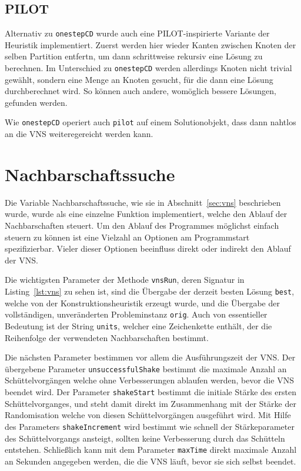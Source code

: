 \subsection{PILOT}
Alternativ zu \texttt{onestepCD} wurde auch eine PILOT-inspirierte Variante der Heuristik implementiert. Zuerst werden hier wieder Kanten zwischen Knoten der selben Partition entfertn, um dann schrittweise rekursiv eine Lösung zu berechnen. Im Unterschied zu \texttt{onestepCD} werden allerdings Knoten nicht trivial gewählt, sondern eine Menge an Knoten gesucht, für die dann eine Lösung durchberechnet wird. So können auch andere, womöglich bessere Lösungen, gefunden werden.

Wie \texttt{onestepCD} operiert auch \texttt{pilot} auf einem Solutionobjekt, dass dann nahtlos an die VNS weiteregereicht werden kann.

\section{Nachbarschaftssuche}
\label{sec:impl:vns}

Die Variable Nachbarschaftssuche, wie sie in Abschnitt~\ref{sec:vns} beschrieben wurde, wurde als eine einzelne Funktion implementiert, welche den Ablauf der Nachbarschaften steuert. Um den Ablauf des Programmes
möglichst einfach steuern zu können ist eine Vielzahl an Optionen am Programmstart spezifizierbar. Vieler dieser Optionen beeinfluss direkt oder indirekt den Ablauf der VNS\@. 

Die wichtigsten Parameter der Methode \texttt{vnsRun}, deren Signatur in Listing~\ref{lst:vns} zu sehen ist, sind die Übergabe der derzeit besten Lösung \texttt{best}, welche von der Konstruktionsheuristik erzeugt wurde, und
die Übergabe der vollständigen, unveränderten Probleminstanz \texttt{orig}. Auch von essentieller Bedeutung ist der String \texttt{units}, welcher eine Zeichenkette enthält, der die Reihenfolge der verwendeten Nachbarschaften bestimmt. 

Die nächsten Parameter bestimmen vor allem die Ausführungszeit der VNS\@. Der übergebene Parameter \texttt{unsuccessfulShake} bestimmt die maximale Anzahl an Schüttelvorgängen welche ohne Verbesserungen ablaufen werden, bevor die VNS beendet wird.
Der Parameter \texttt{shakeStart} bestimmt die initiale Stärke des ersten Schüttelvorganges, und steht damit direkt im Zusammenhang mit der Stärke der Randomisation welche von diesen Schüttelvorgängen ausgeführt wird.
Mit Hilfe des Parameters \texttt{shakeIncrement} wird bestimmt wie schnell der Stärkeparameter des Schüttelvorgangs ansteigt, sollten keine Verbesserung durch das Schütteln entstehen.
Schließlich kann mit dem Parameter \texttt{maxTime} direkt maximale Anzahl an Sekunden angegeben werden, die die VNS läuft, bevor sie sich selbst beendet. 

